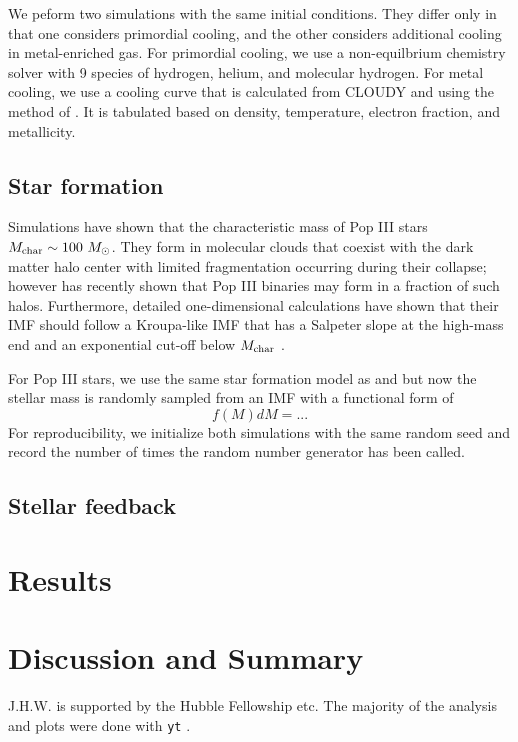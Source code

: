 \documentclass[apjl]{emulateapj}
\begin{document}
We peform two simulations with the same initial conditions.  They
differ only in that one considers primordial cooling, and the other
considers additional cooling in metal-enriched gas.  For primordial
cooling, we use a non-equilbrium chemistry solver with 9 species of
hydrogen, helium, and molecular hydrogen.  For metal cooling, we use a
cooling curve that is calculated from CLOUDY \citep{ref} and using the
method of \citet{ref}.  It is tabulated based on density, temperature,
electron fraction, and metallicity.

\subsection{Star formation}

Simulations have shown that the characteristic mass of Pop III stars
$M_{\rm char} \sim 100~\Ms$.  They form in molecular clouds that
coexist with the dark matter halo center with limited fragmentation
occurring during their collapse; however \citet{Turk10} has recently
shown that Pop III binaries may form in a fraction of such halos.
Furthermore, detailed one-dimensional calculations have shown that
their IMF should follow a Kroupa-like IMF that has a Salpeter slope at
the high-mass end and an exponential cut-off below $M_{\rm char}$
\citep{refs}.  

For Pop III stars, we use the same star formation model as
\citet{Abel07} and \citet{Wise08_Gal} but now the stellar mass is
randomly sampled from an IMF with a functional form of
%
\begin{equation}
\label{eqn:imf}
f(M)dM = ...
\end{equation}
%
For reproducibility, we initialize both simulations with the same
random seed and record the number of times the random number generator
\citep[Mersenne twister;][]{ref} has been called.

\subsection{Stellar feedback}

\section{Results}
\label{sec:results}

\section{Discussion and Summary}

\acknowledgments

J.H.W. is supported by the Hubble Fellowship etc.  The majority of the
analysis and plots were done with \texttt{yt} \citep{yt}.

%

\end{document}
